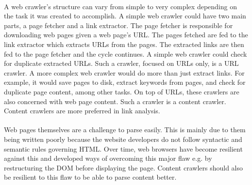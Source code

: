 \paragraph{}
A web crawler’s structure can vary from simple to very complex depending on the task it was created to accomplish. A simple web crawler could have two main parts, a page fetcher and a link extractor. The page fetcher is responsible for downloading web pages given a web page’s URL. The pages fetched are fed to the link extractor which extracts URLs from the pages. The extracted links are then fed to the page fetcher and the cycle continues. A simple web crawler could check for duplicate extracted URLs. Such a crawler, focused on URLs only, is a URL crawler. A more complex web crawler would do more than just extract links. For example, it would save pages to disk, extract keywords from pages, and check for duplicate page content, among other tasks. On top of URLs, these crawlers are also concerned with web page content. Such a crawler is a content crawler. Content crawlers are more preferred in link analysis.
\paragraph{}
Web pages themselves are a challenge to parse easily. This is mainly due to them being written poorly because the website developers do not follow syntactic and semantic rules governing HTML. Over time, web browsers have become resilient against this and developed ways of overcoming this major flaw e.g. by restructuring the DOM before displaying the page. Content crawlers should also be resilient to this flaw to be able to parse content better.
